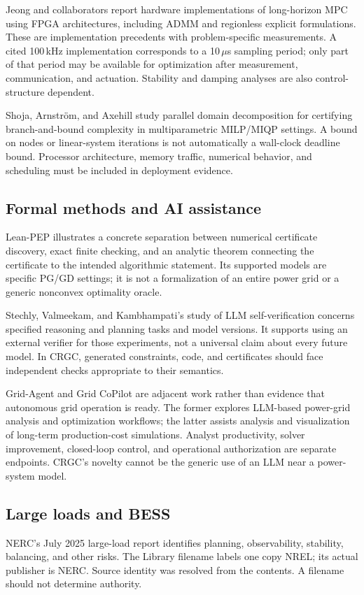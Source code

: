 \documentclass[11pt,letterpaper]{article}
\begin{document}
Jeong and collaborators report hardware implementations of long-horizon MPC using FPGA architectures, including ADMM and regionless explicit formulations.\cite{mpc,mpc2} These are implementation precedents with problem-specific measurements. A cited 100\,kHz implementation corresponds to a 10\,$\mu$s sampling period; only part of that period may be available for optimization after measurement, communication, and actuation. Stability and damping analyses are also control-structure dependent.\cite{mpcdamp}

Shoja, Arnstr\"om, and Axehill study parallel domain decomposition for certifying branch-and-bound complexity in multiparametric MILP/MIQP settings.\cite{complexity} A bound on nodes or linear-system iterations is not automatically a wall-clock deadline bound. Processor architecture, memory traffic, numerical behavior, and scheduling must be included in deployment evidence.

\subsection{Formal methods and AI assistance}
Lean-PEP illustrates a concrete separation between numerical certificate discovery, exact finite checking, and an analytic theorem connecting the certificate to the intended algorithmic statement. Its supported models are specific PG/GD settings; it is not a formalization of an entire power grid or a generic nonconvex optimality oracle.\cite{leanpep}

Stechly, Valmeekam, and Kambhampati's study of LLM self-verification concerns specified reasoning and planning tasks and model versions. It supports using an external verifier for those experiments, not a universal claim about every future model.\cite{selfverify} In CRGC, generated constraints, code, and certificates should face independent checks appropriate to their semantics.

Grid-Agent and Grid CoPilot are adjacent work rather than evidence that autonomous grid operation is ready. The former explores LLM-based power-grid analysis and optimization workflows; the latter assists analysis and visualization of long-term production-cost simulations.\cite{gridagent,gridcopilot} Analyst productivity, solver improvement, closed-loop control, and operational authorization are separate endpoints. CRGC's novelty cannot be the generic use of an LLM near a power-system model.

\subsection{Large loads and BESS}
NERC's July 2025 large-load report identifies planning, observability, stability, balancing, and other risks.\cite{nerc} The Library filename labels one copy NREL; its actual publisher is NERC. Source identity was resolved from the contents. A filename should not determine authority.
\end{document}
